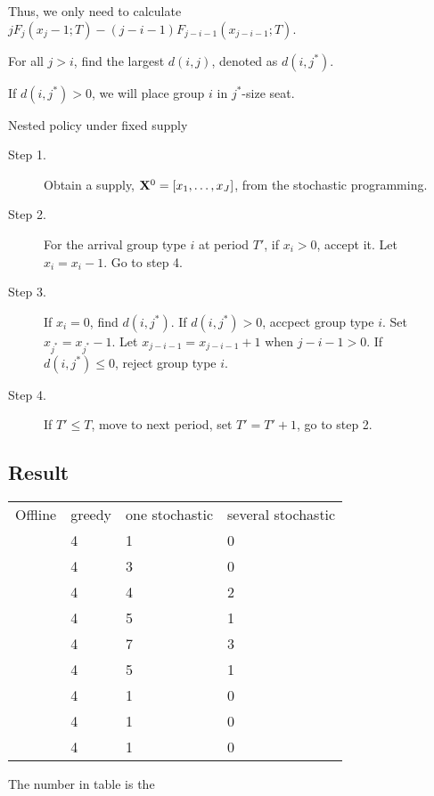 Thus, we only need to calculate $j F_{j}(x_{j}-1; T) - (j-i-1) F_{j-i-1}(x_{j-i-1}; T)$.

For all $j >i$, find the largest $d(i,j)$, denoted as $d(i,j^{*})$.

If $d(i,j^{*}) >0$, we will place group $i$ in $j^{*}$-size seat.

\begin{algorithm}[H]\label{several_class}
  \caption{Nested policy under fixed supply}
  \begin{description}
    \item[Step 1.] Obtain a supply, $\mathbf{X}^{0} = [x_1,\ldots,x_{J}]$, from the stochastic programming.
    \item[Step 2.] For the arrival group type $i$ at period $T{'}$, if $x_{i} > 0$, accept it. Let $x_{i} = x_{i} -1$. Go to step 4.
    \item[Step 3.] If $x_{i} = 0$, find $d(i,j^{*})$. If $d(i,j^{*})>0$, accpect group type $i$. Set $x_{j^{*}} = x_{j^{*}} -1$. Let $x_{j-i-1} = x_{j-i-1} + 1$ when $j-i-1>0$. If $d(i,j^{*}) \leq 0$, reject group type $i$.
    \item[Step 4.] If $T{'} \leq T$, move to next period, set $T{'} = T{'}+1$, go to step 2.
  \end{description}
\end{algorithm}

\subsection{Result}

\begin{table}[ht]
  \begin{tabular}{l|l|l|l}
  \hline
  Offline & greedy & one stochastic & several stochastic \\
    & 4  & 1 & 0 \\
    & 4  & 3 & 0 \\
    & 4  & 4 & 2  \\
    & 4  & 5 & 1 \\
    & 4  & 7 & 3  \\
    & 4  & 5 & 1  \\
    & 4  & 1 & 0  \\
    & 4  & 1 & 0 \\
    & 4  & 1 & 0 \\
  \hline
  \end{tabular}
\end{table}

The number in table is the 

